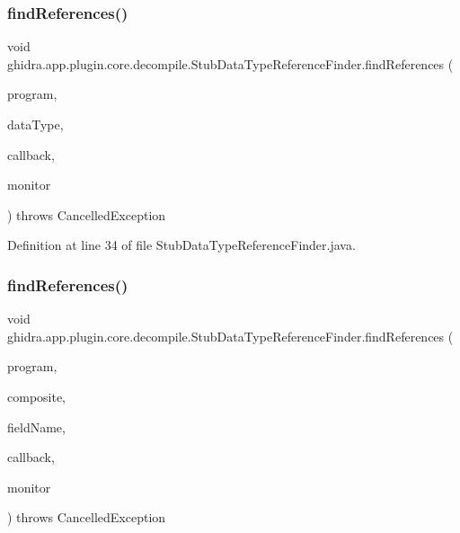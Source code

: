 \subsubsection{\texorpdfstring{findReferences()}{findReferences()}\hspace{0.1cm}{\footnotesize\ttfamily [1/2]}}
{\footnotesize\ttfamily void ghidra.\+app.\+plugin.\+core.\+decompile.\+Stub\+Data\+Type\+Reference\+Finder.\+find\+References (\begin{DoxyParamCaption}\item[{Program}]{program,  }\item[{Data\+Type}]{data\+Type,  }\item[{Consumer$<$ Data\+Type\+Reference $>$}]{callback,  }\item[{Task\+Monitor}]{monitor }\end{DoxyParamCaption}) throws Cancelled\+Exception\hspace{0.3cm}{\ttfamily [inline]}}



Definition at line 34 of file Stub\+Data\+Type\+Reference\+Finder.\+java.

\mbox{\label{classghidra_1_1app_1_1plugin_1_1core_1_1decompile_1_1_stub_data_type_reference_finder_ae0ee53ae792a4d02e338dbec3a508053}} 
\subsubsection{\texorpdfstring{findReferences()}{findReferences()}\hspace{0.1cm}{\footnotesize\ttfamily [2/2]}}
{\footnotesize\ttfamily void ghidra.\+app.\+plugin.\+core.\+decompile.\+Stub\+Data\+Type\+Reference\+Finder.\+find\+References (\begin{DoxyParamCaption}\item[{Program}]{program,  }\item[{Composite}]{composite,  }\item[{String}]{field\+Name,  }\item[{Consumer$<$ Data\+Type\+Reference $>$}]{callback,  }\item[{Task\+Monitor}]{monitor }\end{DoxyParamCaption}) throws Cancelled\+Exception\hspace{0.3cm}{\ttfamily [inline]}}



